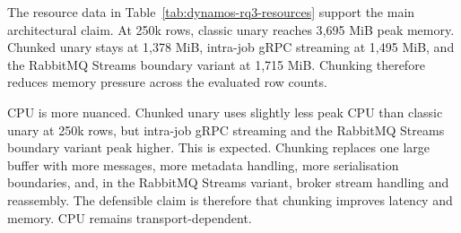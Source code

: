 \begin{table}[!htbp]
    \centering
    \scriptsize
    \caption{Peak sampled resource usage during DYNAMOS bulk retrieval. CPU is peak total millicores; memory is peak total MiB across sampled Kubernetes namespaces.}
    \label{tab:dynamos-rq3-resources}
    \setlength{\tabcolsep}{3pt}
\end{table}

The resource data in Table~\ref{tab:dynamos-rq3-resources} support the main architectural claim. At 250k rows, classic unary reaches 3{,}695 MiB peak memory. Chunked unary stays at 1{,}378 MiB, intra-job gRPC streaming at 1{,}495 MiB, and the RabbitMQ Streams boundary variant at 1{,}715 MiB. Chunking therefore reduces memory pressure across the evaluated row counts.

CPU is more nuanced. Chunked unary uses slightly less peak CPU than classic unary at 250k rows, but intra-job gRPC streaming and the RabbitMQ Streams boundary variant peak higher. This is expected. Chunking replaces one large buffer with more messages, more metadata handling, more serialisation boundaries, and, in the RabbitMQ Streams variant, broker stream handling and reassembly. The defensible claim is therefore that chunking improves latency and memory. CPU remains transport-dependent.

